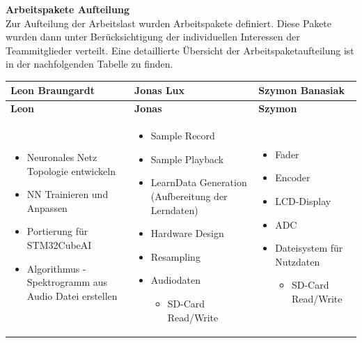 \textbf{Arbeitspakete Aufteilung} \\
Zur Aufteilung der Arbeitslast wurden Arbeitspakete definiert. Diese Pakete wurden dann unter Berücksichtigung der individuellen Interessen der Teammitglieder verteilt. Eine detaillierte Übersicht der Arbeitspaketaufteilung ist in der nachfolgenden Tabelle zu finden.
\begin{longtable}[c]{|p{5cm}|p{5cm}|p{5cm}|}
	\hline
	\textbf{Leon Braungardt} & \textbf{Jonas Lux} & \textbf{Szymon Banasiak}\\
	\hline
	\endfirsthead
	\hline
	\textbf{Leon} & \textbf{Jonas} & \textbf{Szymon}\\
	\hline
	\endhead
	\hline
	\endfoot
	\hline
	\endlastfoot
	
	\begin{itemize}[left=0pt]
		\item Neuronales Netz Topologie entwickeln
		\item NN Trainieren und Anpassen
		\item Portierung für STM32CubeAI
		\item Algorithmus - Spektrogramm aus Audio Datei erstellen
	\end{itemize} &
	\begin{itemize}[left=0pt]
		\item Sample Record
		\item Sample Playback
		\item LearnData Generation (Aufbereitung der Lerndaten)
		\item Hardware Design
		\item Resampling
		\item Audiodaten
		\begin{itemize}[label=--, left=1em]
			\item SD-Card Read/Write
		\end{itemize}
	\end{itemize} &
	\begin{itemize}[left=0pt]
		\item Fader
		\item Encoder
		\item LCD-Display
		\item ADC
		\item Dateisystem für Nutzdaten
		\begin{itemize}[label=--, left=1em]
			\item SD-Card Read/Write
		\end{itemize}
	\end{itemize} \\
	\hline
\end{longtable}